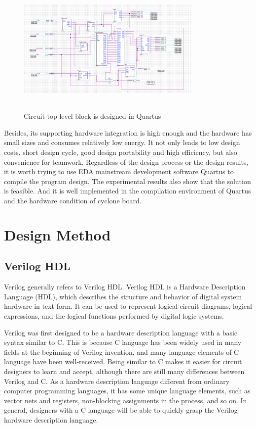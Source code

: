 \documentclass[conference,compsoc]{IEEEtran}
\begin{document}
\begin{figure}[H]
	\centering
	\includegraphics[width=9cm,height=6.5cm]{fig2}
	\caption{Circuit top-level block is designed in Quartus}
	\label{Fig2}
\end{figure}
Besides, its supporting hardware integration is high enough and the hardware has small sizes and consumes relatively low energy. It not only leads to low design costs, short design cycle, good design portability and high efficiency, but also convenience for teamwork. Regardless of the design process or the design results, it is worth trying to use EDA mainstream development software Quartus to compile the program design. The experimental results also show that the solution is feasible. And it is well implemented in the compilation environment of Quartus and the hardware condition of cyclone board.

\section{Design Method}
\subsection{Verilog HDL}
Verilog generally refers to Verilog HDL. Verilog HDL is a Hardware Description Language (HDL), which describes the structure and behavior of digital system hardware in text form. It can be used to represent logical circuit diagrams, logical expressions, and the logical functions performed by digital logic systems.

Verilog was first designed to be a hardware description language with a basic syntax similar to C. This is because C language has been widely used in many fields at the beginning of Verilog invention, and many language elements of C language have been well-received. Being similar to C makes it easier for circuit designers to learn and accept, although there are still many differences between Verilog and C. As a hardware description language different from ordinary computer programming languages, it has some unique language elements, such as vector nets and registers, non-blocking assignments in the process, and so on. In general, designers with a C language will be able to quickly grasp the Verilog hardware description language.
\end{document}
